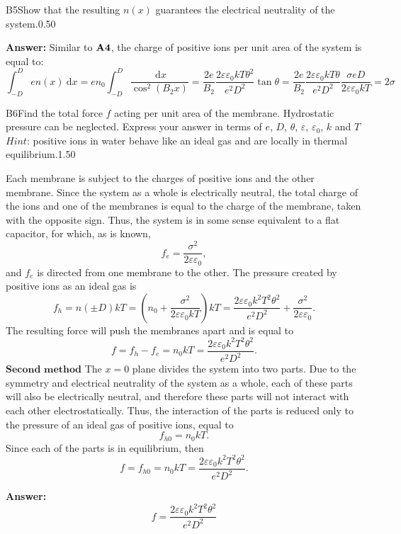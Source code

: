 \documentclass[11pt,a4paper]{article}
\begin{document}
\begin{solcard}{B5}{Show that the resulting $n(x)$ guarantees the electrical neutrality of the system.}{0.50}
\par\smallskip\noindent\textbf{Answer:} Similar to $\bf A4$, the charge of positive ions per unit area of the system is equal to: \[\int_{-D}^Den(x)\mathrm{~d}x=en_0\int_{-D}^D\frac{\mathrm{~d}x}{\cos^2(B_2x)}=\frac{2e}{B_2}\frac{2\varepsilon\varepsilon_0kT\theta^2}{e^2D^2}\tan\theta=\frac{2e}{B_2}\frac{2\varepsilon\varepsilon_0kT\theta}{e^2D^2}\frac{\sigma eD}{2\varepsilon\varepsilon_0kT}=2\sigma\]
\end{solcard}

\begin{solcard}{B6}{Find the total force $f$ acting per unit area of the membrane. Hydrostatic pressure can be neglected. Express your answer in terms of $e$, $D$, $\theta$, $\varepsilon$, $\varepsilon_0$, $k$ and $T$ $\textit{Hint:}$ positive ions in water behave like an ideal gas and are locally in thermal equilibrium.}{1.50}

Each membrane is subject to the charges of positive ions and the other membrane. Since the system as a whole is electrically neutral, the total charge of the ions and one of the membranes is equal to the charge of the membrane, taken with the opposite sign. Thus, the system is in some sense equivalent to a flat capacitor, for which, as is known, \[f_e=\frac{\sigma^2}{2\varepsilon\varepsilon_0},\]and $f_e$ is directed from one membrane to the other. The pressure created by positive ions as an ideal gas is \[f_h=n(\pm D)kT=\left(n_0+\frac{\sigma^2}{2\varepsilon\varepsilon_0kT}\right)kT=\frac{2\varepsilon\varepsilon_0k^2T^2\theta^2}{e^2D^2}+\frac{\sigma^2}{2\varepsilon\varepsilon_0}.\]The resulting force will push the membranes apart and is equal to \[f=f_h-f_e=n_0kT=\frac{2\varepsilon\varepsilon_0k^2T^2\theta^2}{e^2D^2}.\] $\textbf{Second method}$ The $x=0$ plane divides the system into two parts. Due to the symmetry and electrical neutrality of the system as a whole, each of these parts will also be electrically neutral, and therefore these parts will not interact with each other electrostatically. Thus, the interaction of the parts is reduced only to the pressure of an ideal gas of positive ions, equal to \[f_{h0}=n_0kT.\]Since each of the parts is in equilibrium, then\[f=f_{h0}=n_0kT=\frac{2\varepsilon\varepsilon_0k^2T^2\theta^2}{e^2D^2}.\]

\par\smallskip\noindent\textbf{Answer:} \[f=\frac{2\varepsilon\varepsilon_0k^2T^2\theta^2}{e^2D^2}\]
\end{solcard}
\end{document}
